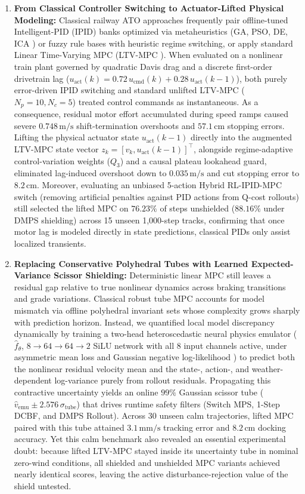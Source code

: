 \documentclass[10pt,a4paper]{article}
\begin{document}
\begin{enumerate}
    \item \textbf{From Classical Controller Switching to Actuator-Lifted Physical Modeling:} Classical railway ATO approaches frequently pair offline-tuned Intelligent-PID (IPID) banks optimized via metaheuristics (GA, PSO, DE, ICA \cite{ref1}) or fuzzy rule bases \cite{ref29} with heuristic regime switching, or apply standard Linear Time-Varying MPC (LTV-MPC \cite{ref2}). When evaluated on a nonlinear train plant governed by quadratic Davis drag and a discrete first-order drivetrain lag ($u_{\text{act}}(k) = 0.72\,u_{\text{cmd}}(k) + 0.28\,u_{\text{act}}(k-1)$), both purely error-driven IPID switching and standard unlifted LTV-MPC ($N_p = 10, N_c = 5$) treated control commands as instantaneous. As a consequence, residual motor effort accumulated during speed ramps caused severe $0.748\,\text{m/s}$ shift-termination overshoots and $57.1\,\text{cm}$ stopping errors. Lifting the physical actuator state $u_{\text{act}}(k-1)$ directly into the augmented LTV-MPC state vector $z_k = [v_k, u_{\text{act}}(k-1)]^\top$, alongside regime-adaptive control-variation weights ($Q_3$) and a causal plateau lookahead guard, eliminated lag-induced overshoot down to $0.035\,\text{m/s}$ and cut stopping error to $8.2\,\text{cm}$. Moreover, evaluating an unbiased 5-action Hybrid RL-IPID-MPC switch (removing artificial penalties against PID actions from Q-cost rollouts) still selected the lifted MPC on $76.23\%$ of steps unshielded ($88.16\%$ under DMPS shielding) across 15 unseen 1,000-step tracks, confirming that once motor lag is modeled directly in state predictions, classical PIDs only assist localized transients.

    \item \textbf{Replacing Conservative Polyhedral Tubes with Learned Expected-Variance Scissor Shielding:} Deterministic linear MPC still leaves a residual gap relative to true nonlinear dynamics across braking transitions and grade variations. Classical robust tube MPC \cite{ref8, ref9} accounts for model mismatch via offline polyhedral invariant sets whose complexity grows sharply with prediction horizon. Instead, we quantified local model discrepancy dynamically by training a two-head heteroscedastic neural physics emulator ($\hat{f}_\theta$, $8 \to 64 \to 64 \to 2$ SiLU network with all 8 input channels active, under asymmetric mean loss and Gaussian negative log-likelihood \cite{ref4, ref33}) to predict both the nonlinear residual velocity mean and the state-, action-, and weather-dependent log-variance purely from rollout residuals. Propagating this contractive uncertainty yields an online $99\%$ Gaussian scissor tube ($\hat{v}_{\text{emu}} \pm 2.576\,\sigma_{\text{tube}}$) that drives runtime safety filters (Switch MPS, 1-Step DCBF, and DMPS Rollout). Across 30 unseen calm trajectories, lifted MPC paired with this tube attained $3.1\,\text{mm/s}$ tracking error and $8.2\,\text{cm}$ docking accuracy. Yet this calm benchmark also revealed an essential experimental doubt: because lifted LTV-MPC stayed inside its uncertainty tube in nominal zero-wind conditions, all shielded and unshielded MPC variants achieved nearly identical scores, leaving the active disturbance-rejection value of the shield untested.


\end{enumerate}
\end{document}
